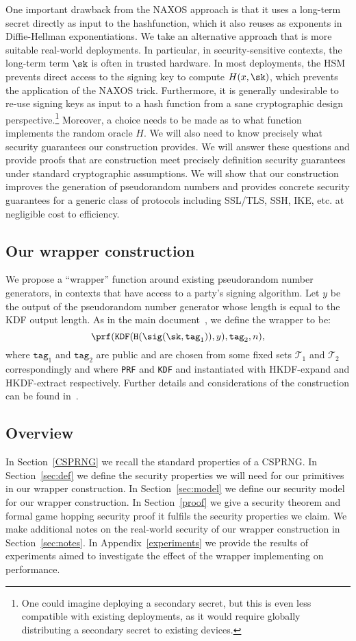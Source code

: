 \documentclass{article}
\begin{document}
One important drawback from the NAXOS approach is that it uses a long-term secret directly as input to the hashfunction, which it also reuses as exponents in  Diffie-Hellman exponentiations.
We take an alternative approach that is more suitable real-world deployments. 
In particular, in security-sensitive contexts, the long-term term $\sk$ is often in trusted hardware. In most deployments, the HSM prevents direct access to the signing key to compute $H(x, \sk)$,
which prevents the application of the NAXOS
trick. Furthermore, it is generally undesirable to re-use signing keys as input to a hash function from a sane cryptographic design perspective.\footnote{One could imagine deploying a secondary secret, but this is even less compatible with existing deployments, as it would require globally distributing a secondary secret to existing devices.}
Moreover, a choice needs to be made as to what function implements the
random oracle $H$. We will also need to know precisely what security
guarantees our construction provides.  We will answer these questions
and provide proofs that are construction meet precisely definition
security guarantees under standard cryptographic assumptions. We will
show that our construction improves the generation of pseudorandom
numbers and provides concrete security guarantees for a generic class of
protocols including SSL/TLS, SSH, IKE, etc. at negligible cost to efficiency. 

\subsection*{Our wrapper construction}

We propose a ``wrapper'' function around existing
pseudorandom number generators, in contexts that have access to a
party's signing algorithm. Let $y$ be the output of the pseudorandom
number generator whose length is equal to the KDF output length. As in the main document~\cite{randomnessirtf}, we define the wrapper to be:
$$
\prf(\texttt{KDF}( \texttt{H}(\sig (\sk, \texttt{tag}_1)),y), \texttt{tag}_2, n),
$$
where $\texttt{tag}_1$ and $\texttt{tag}_2$ are public and are chosen
from some fixed sets $\mathcal{T}_1$ and $\mathcal{T}_2$ correspondingly
and where \texttt{PRF} and \texttt{KDF} and instantiated with
HKDF-expand and HKDF-extract respectively.
Further details and considerations of the construction can be found in~\cite{randomnessirtf}.

\subsection*{Overview}
In Section~\ref{CSPRNG} we recall the standard properties of a CSPRNG. In Section~\ref{sec:def} we define the security properties we will need for our primitives in our wrapper construction. In Section~\ref{sec:model} we define our security model for our wrapper construction. In Section~\ref{proof} we give a security theorem and formal game hopping security proof it fulfils the security properties we claim. We make additional notes on the real-world security of our wrapper construction in Section~\ref{sec:notes}.
In Appendix~\ref{experiments} we provide the results of experiments aimed to investigate the effect of the wrapper implementing on performance.
\end{document}
